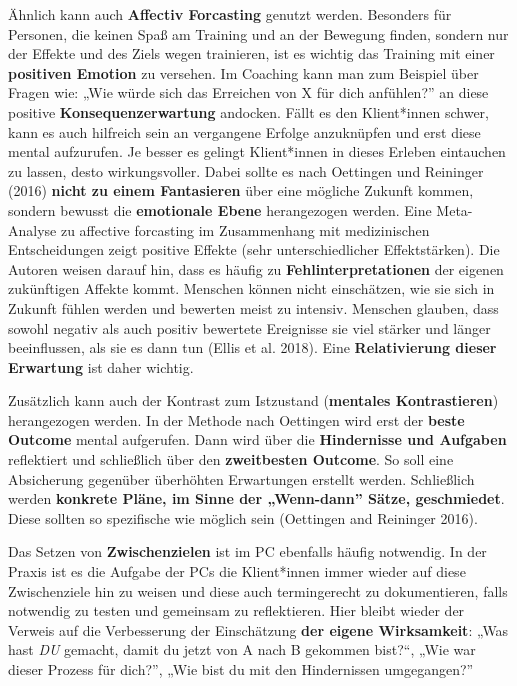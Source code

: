 \documentclass[
  letterpaper,
  DIV=11,
  numbers=noendperiod]{scrreprt}
\begin{document}
Ähnlich kann auch \textbf{Affectiv Forcasting} genutzt werden. Besonders
für Personen, die keinen Spaß am Training und an der Bewegung finden,
sondern nur der Effekte und des Ziels wegen trainieren, ist es wichtig
das Training mit einer \textbf{positiven Emotion} zu versehen. Im
Coaching kann man zum Beispiel über Fragen wie: „Wie würde sich das
Erreichen von X für dich anfühlen?'' an diese positive
\textbf{Konsequenzerwartung} andocken. Fällt es den Klient*innen schwer,
kann es auch hilfreich sein an vergangene Erfolge anzuknüpfen und erst
diese mental aufzurufen. Je besser es gelingt Klient*innen in dieses
Erleben eintauchen zu lassen, desto wirkungsvoller. Dabei sollte es nach
Oettingen und Reininger (2016) \textbf{nicht zu einem Fantasieren} über
eine mögliche Zukunft kommen, sondern bewusst die \textbf{emotionale
Ebene} herangezogen werden. Eine Meta-Analyse zu affective forcasting im
Zusammenhang mit medizinischen Entscheidungen zeigt positive Effekte
(sehr unterschiedlicher Effektstärken). Die Autoren weisen darauf hin,
dass es häufig zu \textbf{Fehlinterpretationen} der eigenen zukünftigen
Affekte kommt. Menschen können nicht einschätzen, wie sie sich in
Zukunft fühlen werden und bewerten meist zu intensiv. Menschen glauben,
dass sowohl negativ als auch positiv bewertete Ereignisse sie viel
stärker und länger beeinflussen, als sie es dann tun (Ellis et al.
2018). Eine \textbf{Relativierung dieser Erwartung} ist daher wichtig.

Zusätzlich kann auch der Kontrast zum Istzustand (\textbf{mentales
Kontrastieren}) herangezogen werden. In der Methode nach Oettingen wird
erst der \textbf{beste Outcome} mental aufgerufen. Dann wird über die
\textbf{Hindernisse und Aufgaben} reflektiert und schließlich über den
\textbf{zweitbesten Outcome}. So soll eine Absicherung gegenüber
überhöhten Erwartungen erstellt werden. Schließlich werden
\textbf{konkrete Pläne, im Sinne der „Wenn-dann'' Sätze, geschmiedet}.
Diese sollten so spezifische wie möglich sein (Oettingen and Reininger
2016).

Das Setzen von \textbf{Zwischenzielen} ist im PC ebenfalls häufig
notwendig. In der Praxis ist es die Aufgabe der PCs die Klient*innen
immer wieder auf diese Zwischenziele hin zu weisen und diese auch
termingerecht zu dokumentieren, falls notwendig zu testen und gemeinsam
zu reflektieren. Hier bleibt wieder der Verweis auf die Verbesserung der
Einschätzung \textbf{der eigene Wirksamkeit}: „Was hast \emph{DU}
gemacht, damit du jetzt von A nach B gekommen bist?``, „Wie war dieser
Prozess für dich?'', „Wie bist du mit den Hindernissen umgegangen?''
\end{document}
